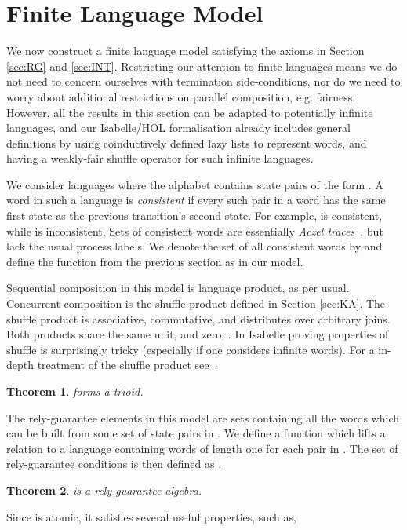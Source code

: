 \documentclass{llncs}
\newtheorem{thm}{Theorem}
\begin{document}
\section{Finite Language Model}
\label{sec:Model}

We now construct a finite language model satisfying the axioms in
Section \ref{sec:RG} and \ref{sec:INT}. Restricting our attention to
finite languages means we do not need to concern ourselves with
termination side-conditions, nor do we need to worry about additional
restrictions on parallel composition, e.g. fairness. However, all the
results in this section can be adapted to potentially infinite
languages, and our Isabelle/HOL formalisation already includes general
definitions by using coinductively defined lazy lists to represent
words, and having a weakly-fair shuffle operator for such infinite
languages.

We consider languages where the alphabet contains state pairs of the
form . A word in such a language is
\emph{consistent} if every such pair in a word has the same first
state as the previous transition's second state. For example,
 is consistent, while
 is inconsistent. Sets of
consistent words are essentially \emph{Aczel
  traces}~\cite{boer_formal_1999}, but lack the usual process
labels. We denote the set of all consistent words by  and define
the function  from the previous section as  in our model.

Sequential composition in this model is language product, as per
usual. Concurrent composition is the shuffle product defined in
Section \ref{sec:KA}. The shuffle product is associative, commutative,
and distributes over arbitrary joins. Both products share the same
unit,  and zero, . In Isabelle proving
properties of shuffle is surprisingly tricky (especially if one
considers infinite words). For a in-depth treatment of the shuffle
product see~\cite{mateescu_shuffle-like_1997}.

\begin{thm}
 forms a trioid.
\end{thm}

The rely-guarantee elements in this model are sets containing all the
words which can be built from some set of state pairs in
. We define a function  which
lifts a relation  to a language containing words of length one for
each pair in . The set of rely-guarantee conditions  is then defined
as .

\begin{thm}
 is a rely-guarantee algebra.
\end{thm}
Since  is atomic, it satisfies several useful properties, such as,
\end{document}
